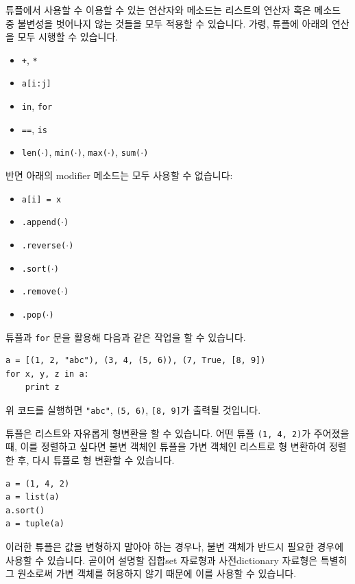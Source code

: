 \documentclass[../main.tex]{subfiles}
\begin{document}
튜플에서 사용할 수 이용할 수 있는 연산자와 메소드는 리스트의 연산자 혹은 메소드 중 불변성을 벗어나지 않는 것들을 모두 적용할 수 있습니다.
가령, 튜플에 아래의 연산을 모두 시행할 수 있습니다.
\begin{itemize}
	\item \texttt{+}, \texttt{*}
	\item \texttt{a[i:j]}
	\item \texttt{in}, \texttt{for}
	\item \texttt{==}, \texttt{is}
	\item \texttt{len($\cdot$)}, \texttt{min($\cdot$)}, \texttt{max($\cdot$)}, \texttt{sum($\cdot$)}
\end{itemize}
반면 아래의 modifier 메소드는 모두 사용할 수 없습니다:
\begin{itemize}
	\item \texttt{a[i] = x}
	\item \texttt{.append($\cdot$)}
	\item \texttt{.reverse($\cdot$)}
	\item \texttt{.sort($\cdot$)}
	\item \texttt{.remove($\cdot$)}
	\item \texttt{.pop($\cdot$)}
\end{itemize}

튜플과 \texttt{for} 문을 활용해 다음과 같은 작업을 할 수 있습니다.
\begin{verbatim}
a = [(1, 2, "abc"), (3, 4, (5, 6)), (7, True, [8, 9])
for x, y, z in a:
	print z
\end{verbatim}
위 코드를 실행하면 \texttt{"abc"}, \texttt{(5, 6)}, \texttt{[8, 9]}가 출력될 것입니다.

튜플은 리스트와 자유롭게 형변환을 할 수 있습니다.
어떤 튜플 \texttt{(1, 4, 2)}가 주어졌을 때, 이를 정렬하고 싶다면 불변 객체인 튜플을 가변 객체인 리스트로 형 변환하여 정렬한 후, 다시 튜플로 형 변환할 수 있습니다.
\begin{verbatim}
a = (1, 4, 2)
a = list(a)
a.sort()
a = tuple(a)
\end{verbatim}

이러한 튜플은 값을 변형하지 말아야 하는 경우나, 불변 객체가 반드시 필요한 경우에 사용할 수 있습니다.
곧이어 설명할 집합set 자료형과 사전dictionary 자료형은 특별히 그 원소로써 가변 객체를 허용하지 않기 때문에 이를 사용할 수 있습니다.
\end{document}
